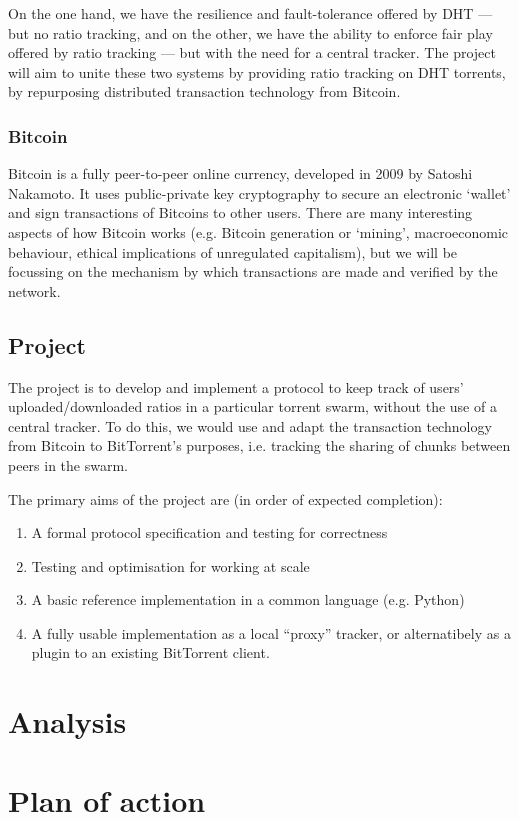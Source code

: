 \documentclass{article}
\begin{document}
On the one hand, we have the resilience and fault-tolerance offered by DHT --- but no ratio tracking, and on the other, we have the ability to enforce fair play offered by ratio tracking --- but with the need for a central tracker.  The project will aim to unite these two systems by providing ratio tracking on DHT torrents, by repurposing distributed transaction technology from Bitcoin.

\subsubsection{Bitcoin}
Bitcoin is a fully peer-to-peer online currency, developed in 2009 by Satoshi Nakamoto.  It uses public-private key cryptography to secure an electronic `wallet' and sign transactions of Bitcoins to other users.  There are many interesting aspects of how Bitcoin works (e.g. Bitcoin generation or `mining', macroeconomic behaviour, ethical implications of unregulated capitalism), but we will be focussing on the mechanism by which transactions are made and verified by the network.

\subsection{Project}

The project is to develop and implement a protocol to keep track of users' uploaded/downloaded ratios in a particular torrent swarm, without the use of a central tracker.  To do this, we would use and adapt the transaction technology from Bitcoin to BitTorrent's purposes, i.e. tracking the sharing of chunks between peers in the swarm.


The primary aims of the project are (in order of expected completion):
\begin{enumerate}
\item A formal protocol specification and testing for correctness
\item Testing and optimisation for working at scale
\item A basic reference implementation in a common language (e.g. Python)
\item A fully usable implementation as a local ``proxy'' tracker, or alternatibely as a plugin to an existing BitTorrent client.
\end{enumerate}


\section{Analysis}

\section{Plan of action}
\end{document}
